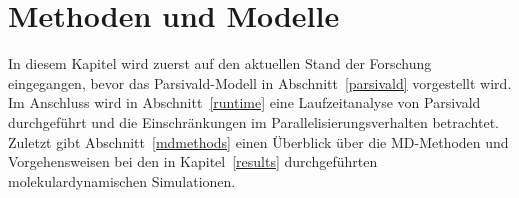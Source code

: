 \chapter{Methoden und Modelle}
\label{models}

In diesem Kapitel wird zuerst auf den aktuellen Stand der Forschung eingegangen, bevor das Parsivald-Modell in Abschnitt~\ref{parsivald} vorgestellt wird.
Im Anschluss wird in Abschnitt~\ref{runtime} eine Laufzeitanalyse von Parsivald durchgeführt und die Einschränkungen im Parallelisierungsverhalten betrachtet.
Zuletzt gibt Abschnitt~\ref{mdmethods} einen Überblick über die MD-Methoden und Vorgehensweisen bei den in Kapitel~\ref{results} durchgeführten molekulardynamischen Simulationen.


\clearpage

\clearpage

\clearpage

